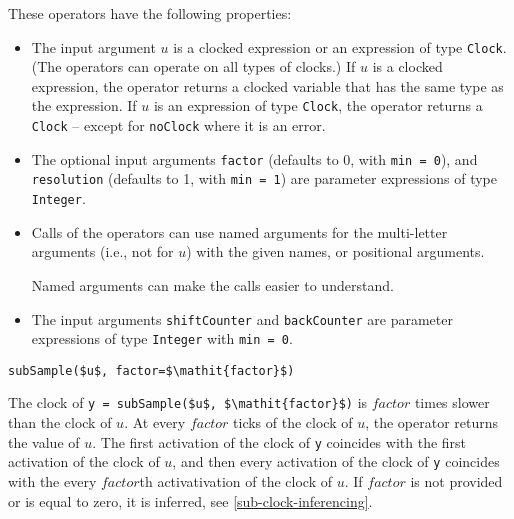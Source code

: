 These operators have the following properties:
\begin{itemize}
\item
  The input argument $u$ is a clocked expression or an expression of type \lstinline!Clock!.
  (The operators can operate on all types of clocks.)
  If $u$ is a clocked expression, the operator returns a clocked variable that has the same type as the expression.
  If $u$ is an expression of type \lstinline!Clock!, the operator returns a \lstinline!Clock! -- except for \lstinline!noClock! where it is an error.
\item
  The optional input arguments \lstinline!factor! (defaults to 0, with \lstinline!min = 0!), and \lstinline!resolution! (defaults to 1, with \lstinline!min = 1!) are parameter expressions of type \lstinline!Integer!.
\item
  Calls of the operators can use named arguments for the multi-letter arguments (i.e., not for $u$) with the given names, or positional arguments.
\begin{nonnormative}
Named arguments can make the calls easier to understand.
\end{nonnormative}
\item
  The input arguments \lstinline!shiftCounter! and \lstinline!backCounter! are parameter expressions of type \lstinline!Integer! with \lstinline!min = 0!.
\end{itemize}

\begin{operatordefinition}[subSample]
\begin{synopsis}\begin{lstlisting}
subSample($u$, factor=$\mathit{factor}$)
\end{lstlisting}\end{synopsis}
\begin{semantics}
The clock of \lstinline!y = subSample($u$, $\mathit{factor}$)! is $\mathit{factor}$ times slower than the clock of $u$.
At every $\mathit{factor}$ ticks of the clock of $u$, the operator returns the value of $u$.
The first activation of the clock of \lstinline!y! coincides with the first activation of the clock of $u$, and then every activation of the clock of \lstinline!y! coincides with the every $\mathit{factor}$th activativation of the clock of $u$.
If $\mathit{factor}$ is not provided or is equal to zero, it is inferred, see \cref{sub-clock-inferencing}.
\end{semantics}
\end{operatordefinition}

